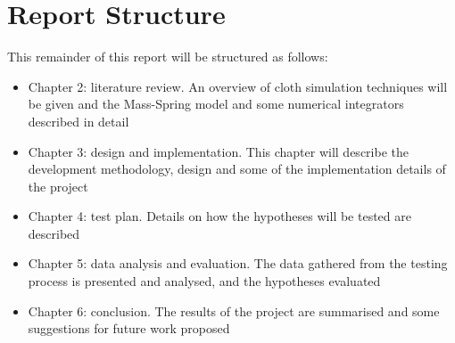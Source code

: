 \section{Report Structure}
This remainder of this report will be structured as follows:
\begin{itemize}
  \item{Chapter 2: literature review. An overview of cloth simulation techniques will be given and the Mass-Spring model and some numerical integrators described in detail}
  \item{Chapter 3: design and implementation. This chapter will describe the development methodology, design and some of the implementation details of the project}
  \item{Chapter 4: test plan. Details on how the hypotheses will be tested are described}
  \item{Chapter 5: data analysis and evaluation. The data gathered from the testing process is presented and analysed, and the hypotheses evaluated}
  \item{Chapter 6: conclusion. The results of the project are summarised and some suggestions for future work proposed}
\end{itemize}
